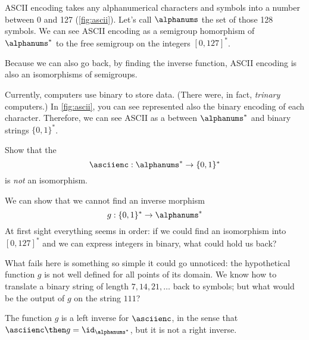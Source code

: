 \begin{example}
    ASCII encoding takes any alphanumerical characters and symbols into a number between 0 and 127 (\cref{fig:ascii}).
    Let's call $\alphanums$ the set of those 128 symbols.
    We can see ASCII encoding as a semigroup homorphism of $\alphanums^*$ to the free semigroup on the integers $[0,127]^*$.

    Because we can also go back, by finding the inverse function, ASCII encoding is also an isomorphisms of semigroups.
\end{example}
\begin{example}
    Currently, computers use binary to store data. (There were, in fact, \emph{trinary} computers.)
    In \cref{fig:ascii}, you can see represented also the binary encoding of each character.
    Therefore, we can see ASCII as a \whomo between $\alphanums^*$ and binary strings $\{0,1\}^*$.
\end{example}
\begin{exercise}
Show that the \whomo
\begin{equation}
\asciienc: \alphanums^* \to \{0,1\}^*
 \end{equation}
 is \emph{not} an isomorphism.
\end{exercise}
\begin{solution}
We can show that we cannot find an inverse morphism
 \begin{equation}
 g:  \{0,1\}^* \to \alphanums^*
 \end{equation}
 At first sight everything seems in order: if we could find an isomorphism into $[0,127]^*$ and
 we can express integers in binary, what could hold us back?

What fails here is something so simple it could go unnoticed: the hypothetical function $g$ is not well defined for all points of its domain. We know how to translate a binary string of length $7,14,21,\dots$ back to symbols; but what would be the output of $g$ on the string $111$?

The function $g$ is a left inverse for $\asciienc$, in the sense that
$\asciienc\then g = \id_{\alphanums^*}$, but it is not a right inverse.

\end{solution}

